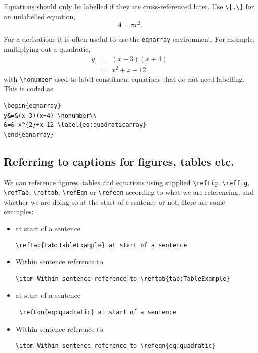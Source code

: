 \documentclass[12pt,oneside]{book} %
\begin{document}
Equations should only be labelled if they are cross-referenced later. Use \verb#\[.\]# for an unlabelled equation,
\[
A=\pi r^2.
\]

For a derivations it is often useful to use the \verb#eqnarray# environment. For example, multiplying out a quadratic,
\begin{eqnarray}
y&=&(x-3)(x+4) \nonumber\\
&=& x^{2}+x-12 \label{eq:quadratic}
\end{eqnarray}
with \verb#\nonumber# used to label constituent equations that do not need labelling. This is coded as 
\begin{verbatim}
\begin{eqnarray}
y&=&(x-3)(x+4) \nonumber\\
&=& x^{2}+x-12 \label{eq:quadraticarray}
\end{eqnarray}
\end{verbatim}

\subsection{Referring to captions for figures, tables etc.}
We can reference figures, tables and equations using supplied \verb#\refFig#, \verb#\reffig#, \linebreak\verb#\refTab#, \verb#\reftab#, \verb#\refEqn# or \verb#\refeqn# according to what we are referencing, and whether we are doing so at the start of a sentence or not. Here are some examples:
\begin{itemize}
\item {} at start of a sentence
\begin{verbatim}
\refTab{tab:TableExample} at start of a sentence 
\end{verbatim}
\item Within sentence reference to  
\begin{verbatim}
\item Within sentence reference to \reftab{tab:TableExample} 
\end{verbatim}
\item {} at start of a sentence
\begin{verbatim}
 \refEqn{eq:quadratic} at start of a sentence
\end{verbatim}
\item Within sentence reference to  
\begin{verbatim}
\item Within sentence reference to \refeqn{eq:quadratic} 
\end{verbatim}
\end{itemize}
\end{document}
